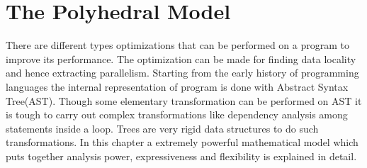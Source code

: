 \documentclass[a4paper,12pt]{book}
\begin{document}
\chapter{The Polyhedral Model}
There are different types optimizations that can be performed on a program to improve its
performance. The optimization can be made for finding data locality and hence extracting
parallelism. Starting from the early history of programming languages the internal representation
of program is done with Abstract Syntax Tree(AST). Though some elementary transformation can
be performed on AST it is tough to carry out complex transformations like dependency analysis among
statements inside a loop. Trees are very rigid data structures to do such transformations.
In this chapter a extremely powerful mathematical model which puts together analysis power,
expressiveness and flexibility is explained in detail.
\end{document}
